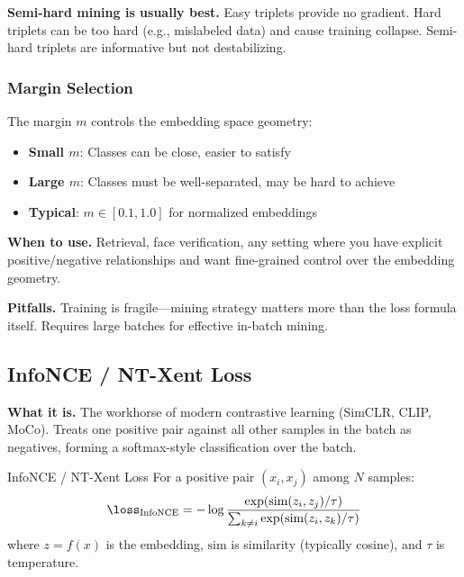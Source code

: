 \begin{keyinsight}
\textbf{Semi-hard mining is usually best.} Easy triplets provide no gradient. Hard triplets can be too hard (e.g., mislabeled data) and cause training collapse. Semi-hard triplets are informative but not destabilizing.
\end{keyinsight}

\subsubsection{Margin Selection}

The margin $m$ controls the embedding space geometry:
\begin{itemize}
    \item \textbf{Small $m$}: Classes can be close, easier to satisfy
    \item \textbf{Large $m$}: Classes must be well-separated, may be hard to achieve
    \item \textbf{Typical}: $m \in [0.1, 1.0]$ for normalized embeddings
\end{itemize}

\textbf{When to use.} Retrieval, face verification, any setting where you have explicit positive/negative relationships and want fine-grained control over the embedding geometry.

\textbf{Pitfalls.} Training is fragile---mining strategy matters more than the loss formula itself. Requires large batches for effective in-batch mining.

\subsection{InfoNCE / NT-Xent Loss}

\textbf{What it is.} The workhorse of modern contrastive learning (SimCLR, CLIP, MoCo). Treats one positive pair against all other samples in the batch as negatives, forming a softmax-style classification over the batch.

\begin{mathresult}{InfoNCE / NT-Xent Loss}
For a positive pair $(x_i, x_j)$ among $N$ samples:
\begin{equation}
\loss_{\text{InfoNCE}} = -\log \frac{\exp(\text{sim}(z_i, z_j) / \tau)}{\sum_{k \neq i} \exp(\text{sim}(z_i, z_k) / \tau)}
\end{equation}
where $z = f(x)$ is the embedding, $\text{sim}$ is similarity (typically cosine), and $\tau$ is temperature.
\end{mathresult}

